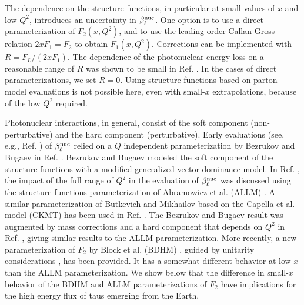 \documentclass[aps,10pt,twocolumn,tightenlines]{revtex4-1}
\begin{document}
The dependence on the structure functions, in particular at small values of $x$ and  low $Q^2$, introduces an uncertainty in $\beta_\ell^{\rm nuc}$.
One option is to use a direct parameterization of $F_2(x,Q^2)$, and to use the leading order Callan-Gross relation 
$2xF_1=F_2$ to obtain $F_1(x,Q^2)$. Corrections can be implemented with $R=F_L/(2xF_1)$. The dependence of
the photonuclear energy loss on a reasonable range of $R$ was shown to be small in Ref. \cite{Koehne:2013gpa}.  In the cases of direct parameterizations, we set $R=0$. Using structure functions based on parton model
evaluations is not possible here, even with small-$x$ extrapolations, because of the low $Q^2$ required.

Photonuclear interactions, in general,  
 consist of the soft component (non-perturbative)
and the hard component (perturbative).
Early evaluations (see, e.g., Ref. \cite{ Lohmann:1985qg}) of $\beta_\ell^{\rm nuc}$ relied on a $Q$ independent parameterization by Bezrukov and Bugaev in Ref. \cite{Bezrukov:1981ci}. 
Bezrukov and Bugaev modeled the soft component of the structure functions with a modified generalized
vector dominance model.
In Ref. \cite{Dutta:2000hh}, the impact of the full range of $Q^2$ in the evaluation of $\beta_\ell^{\rm nuc}$ was discussed using
the structure functions parameterization of Abramowicz et al. (ALLM) \cite{Abramowicz:1991xz,Abramowicz:1997ms}. A similar parameterization of
Butkevich and Mikhailov \cite{Butkevich:2001aw}
based on the Capella et al. model (CKMT) \cite{Capella:1994cr} has been used in Ref. \cite{Chirkin:2004hz,Koehne:2013gpa}. 
The Bezrukov and Bugaev result was augmented by mass corrections and a hard component that depends on $Q^2$  in Ref.
\cite{Bugaev:2002gy,*Bugaev:2003sw}, giving similar results to the ALLM 
parameterization. More recently, a new parameterization of $F_2$ by Block et al. (BDHM) \cite{Block:2014kza}, guided by unitarity
considerations \cite{Block:2013mia,Block:2013nia}, has been provided. It has a somewhat different behavior at low-$x$ than the
ALLM parameterization. We show below that the difference in 
small-$x$ behavior of
the BDHM and ALLM parameterizations of $F_2$ have implications for the high energy flux of taus emerging from the Earth. 
 
\end{document}

